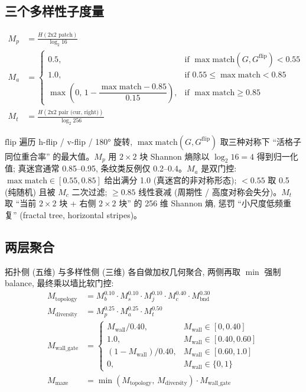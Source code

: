 \subsection{三个多样性子度量}
\begin{align}
  M_p &= \frac{H(\text{2x2 patch})}{\log_2 16} \label{eq:mp}\\
  M_a &= \begin{cases}
    0.5, & \text{if } \max \mathrm{match}(G, G^{\text{flip}}) < 0.55 \\
    1.0, & \text{if } 0.55 \le \max \mathrm{match} < 0.85 \\
    \max\!\left(0,\, 1 - \dfrac{\max \mathrm{match} - 0.85}{0.15}\right), & \text{if } \max \mathrm{match} \ge 0.85
  \end{cases} \label{eq:ma}\\
  M_t &= \frac{H(\text{2x2 pair (cur, right)})}{\log_2 256} \label{eq:mt}
\end{align}

$\mathrm{flip}$ 遍历 h-flip / v-flip / 180° 旋转, $\max \mathrm{match}(G, G^{\text{flip}})$ 取三种对称下 ``活格子同位重合率'' 的最大值。$M_p$ 用 $2{\times}2$ 块 Shannon 熵除以 $\log_2 16 = 4$ 得到归一化值; 真迷宫通常 0.85--0.95, 条纹类反例仅 0.2--0.4。$M_a$ 是双门控: $\max \mathrm{match} \in [0.55, 0.85]$ 给出满分 1.0 (真迷宫的非对称形态); $<0.55$ 取 0.5 (纯随机) 且被 $M_c$ 二次过滤; $\ge 0.85$ 线性衰减 (周期性 / 高度对称会失分)。$M_t$ 取 ``当前 $2{\times}2$ 块 + 右侧 $2{\times}2$ 块'' 的 256 维 Shannon 熵, 惩罚 ``小尺度低频重复'' (fractal tree, horizontal stripes)。

\subsection{两层聚合}

拓扑侧 (五维) 与多样性侧 (三维) 各自做加权几何聚合, 两侧再取 $\min$ 强制 balance, 最终乘以墙比软门控:
\begin{align}
  M_{\text{topology}} &= M_b^{0.10} \cdot M_s^{0.10} \cdot M_j^{0.10} \cdot M_c^{0.40} \cdot M_{\text{bnd}}^{0.30} \label{eq:topo}\\
  M_{\text{diversity}} &= M_p^{0.25} \cdot M_a^{0.25} \cdot M_t^{0.50} \label{eq:div}\\
  M_{\text{wall\_gate}} &= \begin{cases}
    M_{\text{wall}} / 0.40, & M_{\text{wall}} \in [0, 0.40] \\
    1.0, & M_{\text{wall}} \in [0.40, 0.60] \\
    (1 - M_{\text{wall}}) / 0.40, & M_{\text{wall}} \in [0.60, 1.0] \\
    0, & M_{\text{wall}} \in \{0, 1\}
  \end{cases} \label{eq:gate}\\
  M_{\text{maze}} &= \min\!\left(M_{\text{topology}},\, M_{\text{diversity}}\right) \cdot M_{\text{wall\_gate}} \label{eq:final}
\end{align}


